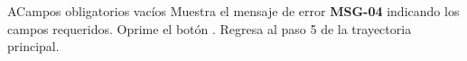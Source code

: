 \begin{UCtrayectoriaA}{A}{Campos obligatorios vacíos}
	\UCpaso Muestra el mensaje de error \textbf{MSG-04} indicando los campos requeridos.
	\UCpaso[\UCactor] Oprime el botón .
	\UCpaso Regresa al paso 5 de la trayectoria principal.
\end{UCtrayectoriaA}

